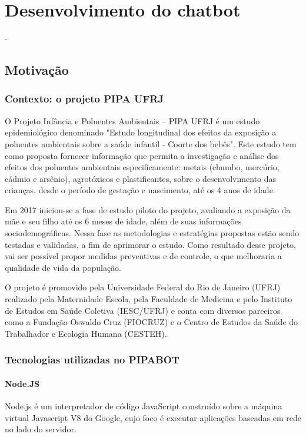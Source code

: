   \chapter{Desenvolvimento do chatbot}
  
-  \section{Motivação}
  
  \subsection{Contexto: o projeto PIPA UFRJ}
  
  O Projeto Infância e Poluentes Ambientais – PIPA UFRJ é um estudo epidemiológico denominado "Estudo longitudinal dos efeitos da exposição a poluentes ambientais sobre a saúde infantil - Coorte dos bebês". Este estudo tem como proposta fornecer informação que permita a investigação e análise dos efeitos dos poluentes ambientais especificamente: metais (chumbo, mercúrio, cádmio e arsênio), agrotóxicos e plastificantes, sobre o desenvolvimento das crianças, desde o período de gestação e nascimento, até os 4 anos de idade. 
  
  Em 2017 iniciou-se a fase de estudo piloto do projeto, avaliando a exposição da mãe e seu filho até os 6 meses de idade, além de suas informações sociodemográficas. Nessa fase as metodologias e estratégias propostas estão sendo testadas e validadas, a fim de aprimorar o estudo. Como resultado desse projeto, vai ser possível propor medidas preventivas e de controle, o que melhoraria a qualidade de vida da população.
  
  O projeto é promovido pela Universidade Federal do Rio de Janeiro (UFRJ) realizado pela Maternidade Escola, pela Faculdade de Medicina e pelo Instituto de Estudos em Saúde Coletiva (IESC/UFRJ) e conta com diversos parceiros como a Fundação Oswaldo Cruz (FIOCRUZ) e o Centro de Estudos da Saúde do Trabalhador e Ecologia Humana (CESTEH).
  
  \subsection{Tecnologias utilizadas no PIPABOT}
  \subsubsection{Node.JS}
  Node.js é um interpretador de código JavaScript construído sobre a máquina virtual Javascript V8 do Google, cujo foco é executar aplicações baseadas em rede no lado do servidor.
  
